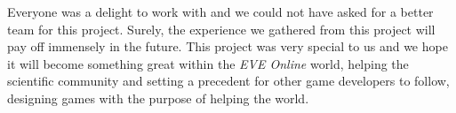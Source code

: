 Everyone was a delight to work with and we could not have asked for a better team for this project. Surely, the experience we gathered from this project will pay off immensely in the future. This project was very special to us and we hope it will become something great within the \emph{EVE Online} world, helping the scientific community and setting a precedent for other game developers to follow, designing games with the purpose of helping the world.